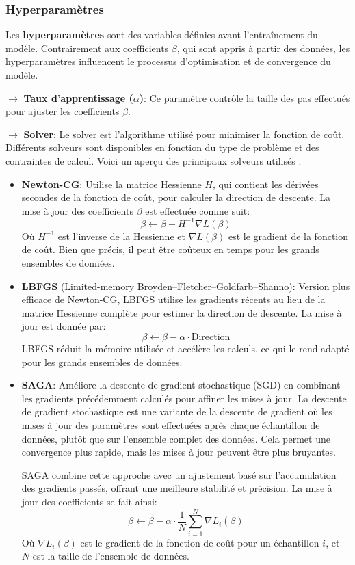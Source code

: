 \subsubsection{Hyperparamètres}

Les \textbf{hyperparamètres} sont des variables définies avant l’entraînement du modèle. Contrairement aux coefficients \( \beta \), qui sont appris à partir des données, les hyperparamètres influencent le processus d'optimisation et de convergence du modèle.

\noindent \textbf{\(\rightarrow\)} \textbf{Taux d'apprentissage (\( \alpha \))}: Ce paramètre contrôle la taille des pas effectués pour ajuster les coefficients \( \beta \).

\noindent \textbf{\(\rightarrow\)} \textbf{Solver}: Le solver est l'algorithme utilisé pour minimiser la fonction de coût. Différents solveurs sont disponibles en fonction du type de problème et des contraintes de calcul. Voici un aperçu des principaux solveurs utilisés :

\begin{itemize}
    \item \textbf{Newton-CG}: Utilise la matrice Hessienne \( H \), qui contient les dérivées secondes de la fonction de coût, pour calculer la direction de descente. La mise à jour des coefficients \( \beta \) est effectuée comme suit:
    \[
    \beta \leftarrow \beta - H^{-1} \nabla L(\beta)
    \]
    Où \( H^{-1} \) est l'inverse de la Hessienne et \( \nabla L(\beta) \) est le gradient de la fonction de coût. Bien que précis, il peut être coûteux en temps pour les grands ensembles de données.

    \item \textbf{LBFGS} (Limited-memory Broyden–Fletcher–Goldfarb–Shanno): Version plus efficace de Newton-CG, LBFGS utilise les gradients récents au lieu de la matrice Hessienne complète pour estimer la direction de descente. La mise à jour est donnée par:
    \[
    \beta \leftarrow \beta - \alpha \cdot \text{Direction}
    \]
    LBFGS réduit la mémoire utilisée et accélère les calculs, ce qui le rend adapté pour les grands ensembles de données.

    \item \textbf{SAGA}: Améliore la descente de gradient stochastique (SGD) en combinant les gradients précédemment calculés pour affiner les mises à jour. La descente de gradient stochastique est une variante de la descente de gradient où les mises à jour des paramètres sont effectuées après chaque échantillon de données, plutôt que sur l'ensemble complet des données. Cela permet une convergence plus rapide, mais les mises à jour peuvent être plus bruyantes.

    SAGA combine cette approche avec un ajustement basé sur l'accumulation des gradients passés, offrant une meilleure stabilité et précision. La mise à jour des coefficients se fait ainsi:
    \[
    \beta \leftarrow \beta - \alpha \cdot \frac{1}{N} \sum_{i=1}^{N} \nabla L_i(\beta)
    \]
    Où \( \nabla L_i(\beta) \) est le gradient de la fonction de coût pour un échantillon \( i \), et \( N \) est la taille de l'ensemble de données.
\end{itemize}

